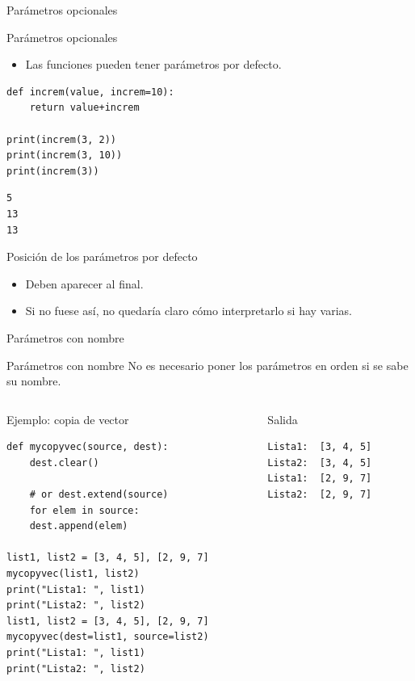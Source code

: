 \documentclass[bigger,unknownkeysallowed]{beamer}
\begin{document}
\begin{frame}[fragile,label={sec:orgb21b8f3}]{Parámetros opcionales}
 \begin{block}{Parámetros opcionales}
\begin{itemize}
\item Las funciones pueden tener parámetros por defecto.
\end{itemize}

\begin{verbatim}
def increm(value, increm=10):
    return value+increm

print(increm(3, 2))
print(increm(3, 10))
print(increm(3))
\end{verbatim}
\scriptsize
\begin{verbatim}
5
13
13
\end{verbatim}
\end{block}

\begin{block}{Posición de los parámetros por defecto}
\begin{itemize}
\item Deben aparecer al final.

\item Si no fuese así, no quedaría claro cómo interpretarlo si hay varias.
\end{itemize}
\end{block}
\end{frame}

\begin{frame}[fragile,label={sec:orgd0e0c59}]{Parámetros con nombre}
 \begin{block}{Parámetros con nombre}
No es necesario poner los parámetros en orden si se sabe su nombre.
\end{block}

\begin{columns}
\begin{column}{0.7\columnwidth}
\begin{exampleblock}{Ejemplo: copia de vector}
\begin{verbatim}
def mycopyvec(source, dest):
    dest.clear()

    # or dest.extend(source)
    for elem in source:
	dest.append(elem)

list1, list2 = [3, 4, 5], [2, 9, 7]
mycopyvec(list1, list2)
print("Lista1: ", list1)
print("Lista2: ", list2)
list1, list2 = [3, 4, 5], [2, 9, 7]
mycopyvec(dest=list1, source=list2)
print("Lista1: ", list1)
print("Lista2: ", list2)
\end{verbatim}
\end{exampleblock}
\end{column}
\begin{column}{0.3\columnwidth}
\begin{block}{Salida}
\scriptsize
\begin{verbatim}
Lista1:  [3, 4, 5]
Lista2:  [3, 4, 5]
Lista1:  [2, 9, 7]
Lista2:  [2, 9, 7]
\end{verbatim}
\end{block}
\end{column}
\end{columns}
\end{frame}
\end{document}
